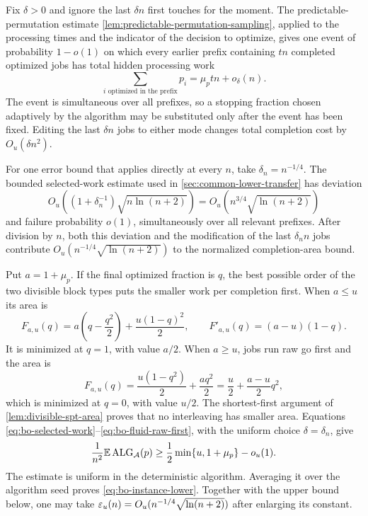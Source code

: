 Fix $\delta>0$ and ignore the last $\delta n$ first touches for the moment.
The predictable-permutation estimate
\cref{lem:predictable-permutation-sampling}, applied to the processing times
and the indicator of the decision to optimize, gives one event of
probability $1-o(1)$ on which every earlier prefix containing $t n$
completed optimized jobs
has total hidden processing work
\begin{equation}
 \sum_{i\text{ optimized in the prefix}}p_i
   =\mu_p t n+o_\delta(n).
 \label{eq:bo-selected-work}
\end{equation}
The event is simultaneous over all prefixes, so a stopping fraction chosen
adaptively by the algorithm may be substituted only after the event has been
fixed.  Editing the last $\delta n$ jobs to either mode changes total
completion cost by $O_u(\delta n^2)$.

For one error bound that applies directly at every $n$, take
$\delta_n=n^{-1/4}$.  The bounded selected-work estimate used in
\cref{sec:common-lower-transfer} has deviation
\[
 O_u\!\left((1+\delta_n^{-1})\sqrt{n\ln(n+2)}\right)
 =O_u\!\left(n^{3/4}\sqrt{\ln(n+2)}\right)
\]
and failure probability $o(1)$, simultaneously over all relevant prefixes.
After division by $n$, both this deviation and the modification of the last
$\delta_n n$ jobs contribute
$O_u(n^{-1/4}\sqrt{\ln(n+2)})$ to the normalized completion-area bound.

Put $a=1+\mu_p$.  If the final optimized fraction is $q$, the best possible
order of the two divisible block types puts the smaller work per completion
first.  When $a\le u$
its area is
\begin{equation}
 F_{a,u}(q)
 =a\left(q-\frac{q^2}{2}\right)
   +\frac{u(1-q)^2}{2},
 \qquad
 F'_{a,u}(q)=(a-u)(1-q).
 \label{eq:bo-fluid-opt-first}
\end{equation}
It is minimized at $q=1$, with value $a/2$.  When $a\ge u$, jobs run raw go
first and the area is
\begin{equation}
 F_{a,u}(q)
 =\frac{u(1-q^2)}2+\frac{a q^2}2
 =\frac u2+\frac{a-u}{2}q^2,
 \label{eq:bo-fluid-raw-first}
\end{equation}
which is minimized at $q=0$, with value $u/2$.  The shortest-first argument
of \cref{lem:divisible-spt-area} proves that no interleaving has smaller area.
Equations
\eqref{eq:bo-selected-work}--\eqref{eq:bo-fluid-raw-first}, with the uniform
choice $\delta=\delta_n$, give
\[
 \frac1{n^2}\mathbb{E}\operatorname{ALG}_{\mathcal A}(p)
 \ge\frac12\min\{u,1+\mu_p\}-o_u(1).
\]
The estimate is uniform in the deterministic algorithm.  Averaging it over the
algorithm seed proves \eqref{eq:bo-instance-lower}.  Together with the upper
bound below, one may
take $\varepsilon_u(n)=O_u(n^{-1/4}\sqrt{\ln(n+2)})$ after enlarging its constant.

